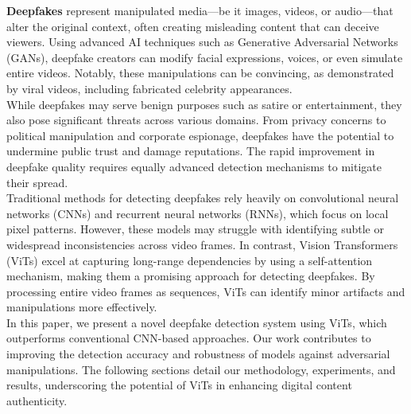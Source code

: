 \textbf{Deepfakes} represent manipulated media—be it images, videos, or audio—that alter the original context, often creating misleading content that can deceive viewers. Using advanced AI techniques such as Generative Adversarial Networks (GANs), deepfake creators can modify facial expressions, voices, or even simulate entire videos. Notably, these manipulations can be convincing, as demonstrated by viral videos, including fabricated celebrity appearances.\\


 While deepfakes may serve benign purposes such as satire or entertainment, they also pose significant threats across various domains. From privacy concerns to political manipulation and corporate espionage, deepfakes have the potential to undermine public trust and damage reputations. The rapid improvement in deepfake quality requires equally advanced detection mechanisms to mitigate their spread.\\

Traditional methods for detecting deepfakes rely heavily on convolutional neural networks (CNNs) and recurrent neural networks (RNNs), which focus on local pixel patterns. However, these models may struggle with identifying subtle or widespread inconsistencies across video frames. In contrast, Vision Transformers (ViTs) excel at capturing long-range dependencies by using a self-attention mechanism, making them a promising approach for detecting deepfakes. By processing entire video frames as sequences, ViTs can identify minor artifacts and manipulations more effectively.\\

In this paper, we present a novel deepfake detection system using ViTs, which outperforms conventional CNN-based approaches. Our work contributes to improving the detection accuracy and robustness of models against adversarial manipulations. The following sections detail our methodology, experiments, and results, underscoring the potential of ViTs in enhancing digital content authenticity.\\